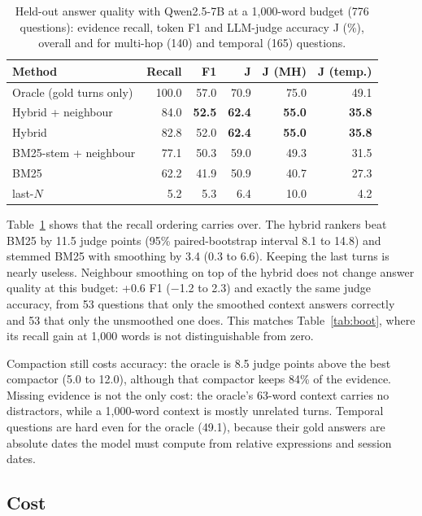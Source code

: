 \documentclass[11pt]{article}
\begin{document}
\begin{table}[t]
  \centering
  \small
  \begin{tabular}{lrrrrr}
    \toprule
    Method & Recall & F1 & J & J (MH) & J (temp.) \\
    \midrule
    Oracle (gold turns only) & 100.0 & 57.0 & 70.9 & 75.0 & 49.1 \\
    Hybrid + neighbour       & 84.0 & \textbf{52.5} & \textbf{62.4} & \textbf{55.0} & \textbf{35.8} \\
    Hybrid                   & 82.8 & 52.0 & \textbf{62.4} & \textbf{55.0} & \textbf{35.8} \\
    BM25-stem + neighbour    & 77.1 & 50.3 & 59.0 & 49.3 & 31.5 \\
    BM25                     & 62.2 & 41.9 & 50.9 & 40.7 & 27.3 \\
    last-$N$                 & 5.2  & 5.3  & 6.4  & 10.0 & 4.2 \\
    \bottomrule
  \end{tabular}
  \caption{Held-out answer quality with Qwen2.5-7B at a 1,000-word budget (776 questions):
  evidence recall, token F1 and LLM-judge accuracy J (\%), overall and for multi-hop (140) and
  temporal (165) questions.}
  \label{tab:qa}
\end{table}

Table~\ref{tab:qa} shows that the recall ordering carries over. The hybrid rankers beat BM25 by
11.5 judge points (95\% paired-bootstrap interval 8.1 to 14.8) and stemmed BM25 with smoothing
by 3.4 (0.3 to 6.6). Keeping the last turns is nearly useless. Neighbour smoothing on top of the
hybrid does not change answer quality at this budget: +0.6 F1 ($-$1.2 to 2.3) and exactly the
same judge accuracy, from 53 questions that only the smoothed context answers correctly and 53
that only the unsmoothed one does. This matches Table~\ref{tab:boot}, where its recall gain at
1,000 words is not distinguishable from zero.

Compaction still costs accuracy: the oracle is 8.5 judge points above the best compactor
(5.0 to 12.0), although that compactor keeps 84\% of the evidence. Missing evidence is not the
only cost: the oracle's 63-word context carries no distractors, while a 1,000-word context is
mostly unrelated turns. Temporal questions are hard even for the oracle (49.1), because their
gold answers are absolute dates the model must compute from relative expressions and session
dates.

\subsection{Cost}
\end{document}
